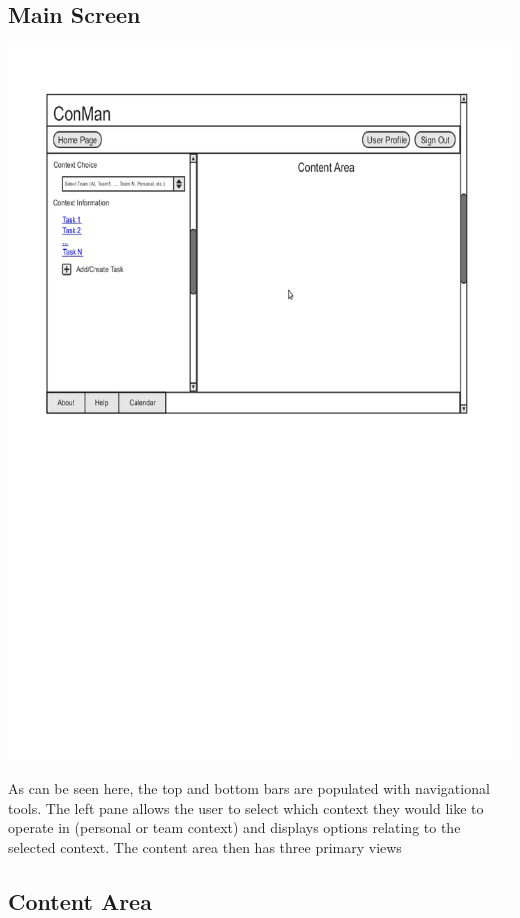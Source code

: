 \documentclass{article}
\begin{document}
\subsection{Main Screen}
\begin{center}
\includegraphics[trim = 0cm 14cm 0cm 0cm, clip=true, scale=0.7]{images/mainscreen}
\end{center}
As can be seen here, the top and bottom bars are populated with navigational tools.
The left pane allows the user to select which context they would like to operate in (personal or team context) and displays options relating to the selected context.
The content area then has three primary views
\subsection{Content Area}
\end{document}
